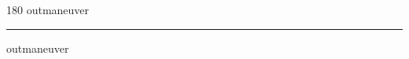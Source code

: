 
\begin{frame}
\begin{center}
\begin{turn}{180}
{\fontsize{2.5cm}{1em}\selectfont outmaneuver}
\end{turn}
\vspace{1em}\par  
\hrule
\vspace{1em}\par  
{\fontsize{2.5cm}{1em}\selectfont outmaneuver}
\end{center}
\end{frame}
